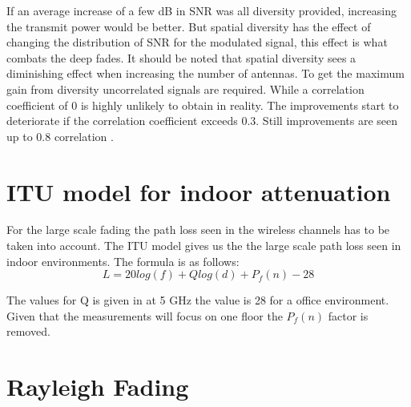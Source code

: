 If an average increase of a few dB in \gls{SNR} was all diversity provided, increasing the transmit power would be better. But spatial diversity has the effect of changing the distribution of \gls{SNR} for the modulated signal, this effect is what combats the deep fades. It should be noted that spatial diversity sees a diminishing effect when increasing the number of antennas.
To get the maximum gain from diversity uncorrelated signals are required. While a correlation coefficient of 0 is highly unlikely to obtain in reality. The improvements start to deteriorate if the correlation coefficient exceeds 0.3. Still improvements are seen up to 0.8 correlation \citep[317]{The_Mobile_Radio_Propagation_Channelbook}.

\section{ITU model for indoor attenuation}
\label{ITU_model}
For the large scale fading the path loss seen in the wireless channels has to be taken into account. The ITU model gives us the the large scale path loss seen in indoor environments. The formula is as follows:
\begin{equation}
L = 20log (f) + Q log (d) + P_f(n) - 28
\end{equation}

\begin{where}
\end{where}

The values for Q is given in \citep{ITU_indoor} at 5 GHz the value is 28 for a office environment. Given that the measurements will focus on one floor the $P_f(n)$ factor is removed.

	
\section{Rayleigh Fading} 




